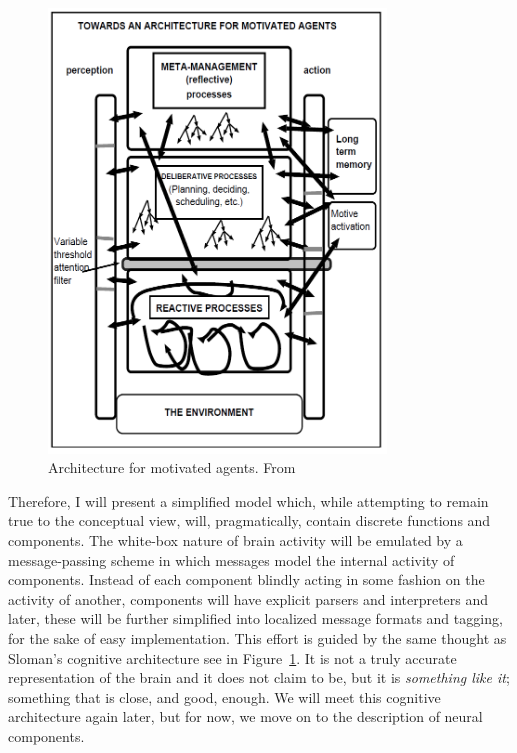 \begin{figure}
	\centering
	\includegraphics[width=0.8\textwidth]{Figs/slomanSystem.png}
	\caption{Architecture for motivated agents. From \cite[p. 10]{sloman1997}}
	\label{fig:slomanSystem}
\end{figure}

Therefore, I will present a simplified model which, while attempting to remain true to the conceptual view, will, pragmatically, contain discrete functions and components. The white-box nature of brain activity will be emulated by a message-passing scheme in which messages model the internal activity of components. Instead of each component blindly acting in some fashion on the activity of another, components will have explicit parsers and interpreters and later, these will be further simplified into localized message formats and tagging, for the sake of easy implementation.
This effort is guided by the same thought as Sloman's cognitive architecture see in Figure~\ref{fig:slomanSystem}. It is not a truly accurate representation of the brain and it does not claim to be, but it is {\em something like it}; something that is close, and good, enough. We will meet this cognitive architecture again later, but for now, we move on to the description of neural components.

